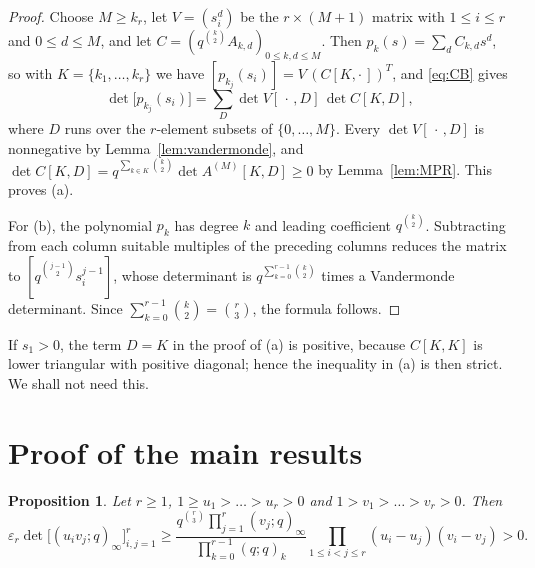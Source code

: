 \documentclass{amsart}
\newtheorem{proposition}[theorem]{Proposition}
\theoremstyle{remark}
\numberwithin{equation}{section}
\begin{document}
\begin{proof}
Choose $M\ge k_r$, let $V=(s_i^d)$ be the $r\times(M+1)$ matrix with $1\le i\le r$ and $0\le d\le M$, and let $C=(q^{\binom k2}A_{k,d})_{0\le k,d\le M}$. Then $p_k(s)=\sum_dC_{k,d}s^d$, so with $K=\{k_1,\dots,k_r\}$ we have $[p_{k_j}(s_i)]=V\,(C[K,\cdot\,])^{T}$, and \eqref{eq:CB} gives
\[
\det\bigl[p_{k_j}(s_i)\bigr]=\sum_{D}\det V[\,\cdot\,,D]\,\det C[K,D],
\]
where $D$ runs over the $r$-element subsets of $\{0,\dots,M\}$. Every $\det V[\,\cdot\,,D]$ is nonnegative by Lemma~\ref{lem:vandermonde}, and $\det C[K,D]=q^{\sum_{k\in K}\binom k2}\det A^{(M)}[K,D]\ge0$ by Lemma~\ref{lem:MPR}. This proves (a).

For (b), the polynomial $p_k$ has degree $k$ and leading coefficient $q^{\binom k2}$. Subtracting from each column suitable multiples of the preceding columns reduces the matrix to $[q^{\binom{j-1}2}s_i^{j-1}]$, whose determinant is $q^{\sum_{k=0}^{r-1}\binom k2}$ times a Vandermonde determinant. Since $\sum_{k=0}^{r-1}\binom k2=\binom r3$, the formula follows.
\end{proof}

If $s_1>0$, the term $D=K$ in the proof of (a) is positive, because $C[K,K]$ is lower triangular with positive diagonal; hence the inequality in (a) is then strict. We shall not need this.

\section{Proof of the main results}\label{sec:proof}

\begin{proposition}\label{prop:key}
Let $r\ge1$, $1\ge u_1>\dots>u_r>0$ and $1>v_1>\dots>v_r>0$. Then
\[
\varepsilon_r\det\bigl[(u_iv_j;q)_\infty\bigr]_{i,j=1}^r
\ge\frac{q^{\binom r3}\prod_{j=1}^r(v_j;q)_\infty}{\prod_{k=0}^{r-1}(q;q)_k}
\prod_{1\le i<j\le r}(u_i-u_j)(v_i-v_j)>0 .
\]
\end{proposition}
\end{document}
